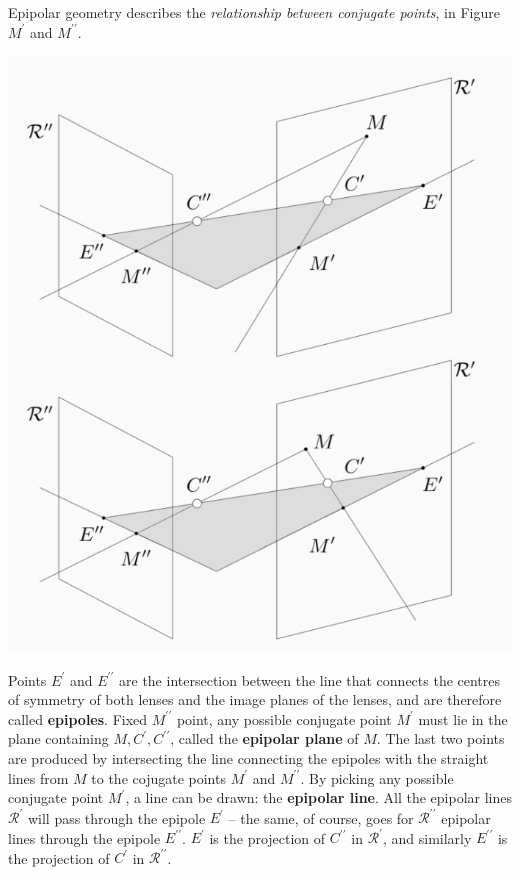 \documentclass[10pt]{report}
\begin{document}
Epipolar geometry describes the \emph{relationship between conjugate points}, in Figure \(M^\prime\) and \(M^{\prime\prime}\).

\begin{center}
\includegraphics[scale=0.3]{./pics/stereo/epipolar-scheme.jpg}
\end{center}

Points \(E^\prime\) and \(E^{\prime\prime}\) are the intersection between the line that connects the centres of symmetry of both lenses and the image planes of the lenses, and are therefore called    \textbf{epipoles}. Fixed \(M^{\prime\prime}\) point, any possible conjugate point \(M^\prime\) must lie in the plane containing \(M, C^\prime, C^{\prime\prime}\), called the \textbf{epipolar plane} of \(M\). The last two points are produced by intersecting the line connecting the epipoles with the straight lines from \(M\) to the cojugate points \(M^\prime\) and \(M^{\prime\prime}\). By picking any possible conjugate point \(M^\prime\), a line can be drawn: the \textbf{epipolar line}. All the epipolar lines \(\mathcal R^\prime\) will pass through the epipole \(E^\prime\) -- the same, of course, goes for \(\mathcal R^{\prime\prime}\) epipolar lines through the epipole \(E^{\prime\prime}\). \(E^\prime\) is the projection of \(C^{\prime\prime}\) in \(\mathcal R^\prime\), and similarly \(E^{\prime\prime}\) is the projection of \(C^\prime\) in \(\mathcal R^{\prime\prime}\).
\end{document}
